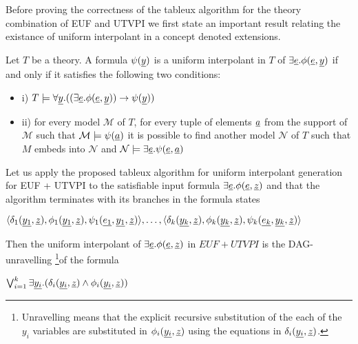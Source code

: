 Before proving the correctness of the tableux algorithm 
for the theory combination of EUF and UTVPI we first state
an important result relating the existance of uniform 
interpolant in a concept denoted extensions.

\begin{lemma} \cite{10.1007/978-3-030-29436-6_9} \label{cover_extension_lemma}
  Let $T$ be a theory. 
  A formula $\psi(\underline{y})$ is a uniform interpolant
  in $T$ of $\exists \underline{e} . \phi (\underline{e}, \underline{y})$
  if and only if it satisfies the following two conditions:

  \begin{itemize}
    \item[] i) $T \models \forall \underline{y}. ((\exists \underline{e} . 
    \phi(\underline{e}, \underline{y})) \rightarrow \psi(\underline{y}))$
  \item[] ii) for every model $\mathcal{M}$ of $T$, for every
  tuple of elements $\underline{a}$ from the support of $\mathcal{M}$
  such that $\mathcal{M} \models \psi(\underline{a})$ it is 
  possible to find another model $\mathcal{N}$ of $T$
  such that $M$ embeds into $\mathcal{N}$ and $\mathcal{N}
  \models \exists \underline{e} . \psi (\underline{e}, \underline{a})$
  \end{itemize}
\end{lemma}

\begin{theorem}
  Let us apply the proposed tableux algorithm 
  for uniform interpolant generation for EUF + UTVPI to the
  satisfiable input formula 
  $\exists \underline{e}. \phi(\underline{e}, \underline{z})$ and
  that the algorithm terminates with its branches in the
  formula states

  $\langle 
  \delta_1(\underline{y_1}, \underline{z}), 
  \phi_1(\underline{y_1}, \underline{z}),
  \psi_1(\underline{e_1}, \underline{y_1}, \underline{z})
  \rangle, \dots, \langle 
  \delta_k(\underline{y_k}, \underline{z}), 
  \phi_k(\underline{y_k}, \underline{z}),
  \psi_k(\underline{e_k}, \underline{y_k}, \underline{z})
  \rangle$

  Then the uniform interpolant of $\exists \underline{e} . \phi(\underline{e},
\underline{z})$ in $EUF + UTVPI$ is the DAG-unravelling \footnote{
  Unravelling means that the explicit recursive 
  substitution of the each of the $y_i$
  variables are substituted in $\phi_i(\underline{y_i}, \underline{z})$ using
  the equations in $\delta_i(\underline{y_i}, \underline{z})$.
}of the formula 

$\bigvee_{i=1}^k \exists \underline{y_i} . (\delta_i(\underline{y_i}, \underline{z}) \land \phi_i(\underline{y_i}, \underline{z}))$

\end{theorem}

